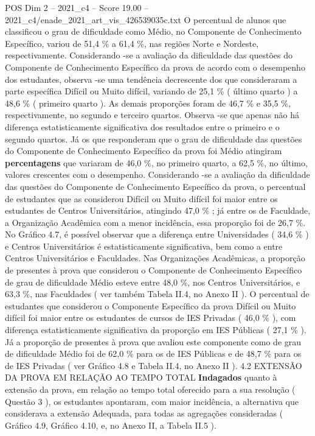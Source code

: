 \begin{textsample}{POS Dim 2 – 2021\_c4 – Score 19.00 – 2021\_c4/enade\_2021\_art\_vis\_426539035c.txt}
O percentual de alunos que classificou o grau de dificuldade como Médio, no Componente de Conhecimento Específico, variou de 51,4 \% a 61,4 \%, nas regiões Norte e Nordeste, respectivamente.
Considerando -se a avaliação da dificuldade das questões do Componente de Conhecimento Específico da prova de acordo com o desempenho dos estudantes, observa -se uma tendência decrescente dos que consideraram a parte específica Difícil ou Muito difícil, variando de 25,1 \% ( último quarto ) a 48,6 \% ( primeiro quarto ).
As demais proporções foram de 46,7 \% e 35,5 \%, respectivamente, no segundo e terceiro quartos.
Observa -se que apenas não há diferença estatisticamente significativa dos resultados entre o primeiro e o segundo quartos.
Já os que responderam que o grau de dificuldade das questões do Componente de Conhecimento Específico da prova foi Médio atingiram \textbf{percentagens} que variaram de 46,0 \%, no primeiro quarto, a 62,5 \%, no último, valores crescentes com o desempenho.
Considerando -se a avaliação da dificuldade das questões do Componente de Conhecimento Específico da prova, o percentual de estudantes que as considerou Difícil ou Muito difícil foi maior entre os estudantes de Centros Universitários, atingindo 47,0 \% ; já entre os de Faculdade, a Organização Acadêmica com a menor incidência, essa proporção foi de 26,7 \%.
No Gráfico 4.7, é possível observar que a diferença entre Universidades ( 34,6 \% ) e Centros Universitários é estatisticamente significativa, bem como a entre Centros Universitários e Faculdades.
Nas Organizações Acadêmicas, a proporção de presentes à prova que considerou o Componente de Conhecimento Específico de grau de dificuldade Médio esteve entre 48,0 \%, nos Centros Universitários, e 63,3 \%, nas Faculdades ( ver também Tabela II.4, no Anexo II ).
O percentual de estudantes que considerou o Componente Específico da prova Difícil ou Muito difícil foi maior entre os estudantes de cursos de IES Privadas ( 46,0 \% ), com diferença estatisticamente significativa da proporção em IES Públicas ( 27,1 \% ).
Já a proporção de presentes à prova que avaliou este componente como de grau de dificuldade Médio foi de 62,0 \% para os de IES Públicas e de 48,7 \% para os de IES Privadas ( ver Gráfico 4.8 e Tabela II.4, no Anexo II ). 4.2 EXTENSÃO DA PROVA EM RELAÇÃO AO TEMPO TOTAL \textbf{Indagados} quanto à extensão da prova, em relação ao tempo total oferecido para a sua resolução ( Questão 3 ), os estudantes apontaram, com maior incidência, a alternativa que considerava a extensão Adequada, para todas as agregações consideradas ( Gráfico 4.9, Gráfico 4.10, e, no Anexo II, a Tabela II.5 ).

\end{textsample}
